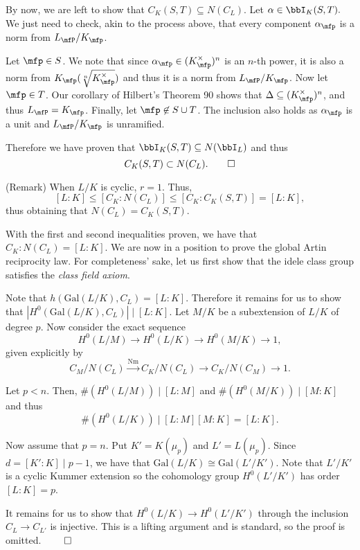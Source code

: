 \documentclass[a4paper, 12pt,oneside,openany]{book}
\begin{document}
By now, we are left to show that $C_K(S, T) \subseteq N(C_L)$. Let $\alpha \in \bbI_K(S, T).$ We just need to check, akin to the process above, that every component $\alpha_\mfp$ is a norm from $L_\mfP/K_\mfp$. 

Let $\mfp \in S$.  We note that since $\alpha_\mfp \in (K_\mfp^\times)^n$ is an $n$-th power, it is also a norm from $K_\mfp(\sqrt[n]{K_\mfp^\times})$ and thus it is a norm from $L_\mfP/K_\mfp$. Now let $\mfp \in T$. Our corollary of Hilbert's Theorem 90 shows that $\Delta \subseteq (K_\mfp^\times)^n$, and thus $L_\mfP = K_\mfp$. Finally, let $\mfp \not\in S \cup T$. The inclusion also holds as $\alpha_\mfp$ is a unit and $L_\mfP/K_\mfp$ is unramified. 

Therefore we have proven that $\bbI_K(S, T) \subseteq N(\bbI_L)$ and thus $$C_K(S, T) \subset N(C_L). \qed$$

(Remark) When $L/K$ is cyclic, $r=1$. Thus, $$[L:K] \leq [C_K: N(C_L)] \leq [C_K : C_K(S, T)] = [L:K],$$ thus obtaining that $N(C_L)=C_K(S, T).$ 

With the first and second inequalities proven, we have that $C_K:N(C_L) =[L:K].$ We are now in a position to prove the global Artin reciprocity law. For completeness' sake, let us first show that the idele class group satisfies the \emph{class field axiom}.


 Note that $h(\text{Gal}(L/K), C_L)=[L:K]$. Therefore it remains for us to show that $|H^0(\text{Gal}(L/K), C_L)| \mid [L:K].$ Let $M/K$ be a subextension of $L/K$ of degree $p$. Now consider the exact sequence $$H^0(L/M) \to H^0(L/K) \to H^0(M/K) \to 1,$$ given explicitly by $$C_M / N(C_L) \xrightarrow{\text{Nm}} C_K/N(C_L) \to C_K / N(C_M) \to 1.$$

Let $p < n$. Then, $\#(H^0(L/M)) \mid [L:M]$ and $\#(H^0(M/K)) \mid [M:K]$ and thus $$\#(H^0(L/K)) \mid [L:M][M:K] = [L:K].$$

Now assume that $p=n$. Put $K' = K(\mu_p)$ and $L' = L(\mu_p)$. Since $d = [K':K] \mid p-1$, we have that $\text{Gal}(L/K) \cong \text{Gal}(L'/K')$. Note that $L'/K'$ is a cyclic Kummer extension so the cohomology group $H^0(L'/K')$ has order $[L:K]=p$.

It remains for us to show that $H^0(L/K) \to H^0(L'/K')$ through the inclusion $C_L \to C_{L'}$ is injective. This is a lifting argument and is standard, so the proof is omitted. $\qed$
\end{document}
